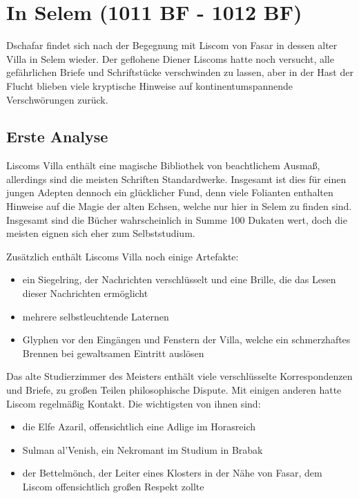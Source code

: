 \hypertarget{in-selem-1011-bf---1012-bf}{%
\section{In Selem (1011 BF - 1012
BF)}\label{in-selem-1011-bf---1012-bf}}

Dschafar findet sich nach der Begegnung mit Liscom von Fasar in dessen
alter Villa in Selem wieder. Der geflohene Diener Liscoms hatte noch
versucht, alle gefährlichen Briefe und Schriftstücke verschwinden zu
lassen, aber in der Hast der Flucht blieben viele kryptische Hinweise
auf kontinentumspannende Verschwörungen zurück.

\hypertarget{erste-analyse}{%
\subsection{Erste Analyse}\label{erste-analyse}}

Liscoms Villa enthält eine magische Bibliothek von beachtlichem Ausmaß,
allerdings sind die meisten Schriften Standardwerke. Insgesamt ist dies
für einen jungen Adepten dennoch ein glücklicher Fund, denn viele
Folianten enthalten Hinweise auf die Magie der alten Echsen, welche nur
hier in Selem zu finden sind. Insgesamt sind die Bücher wahrscheinlich
in Summe 100 Dukaten wert, doch die meisten eignen sich eher zum
Selbststudium.

Zusätzlich enthält Liscoms Villa noch einige Artefakte:

\begin{itemize}
\tightlist
\item
  ein Siegelring, der Nachrichten verschlüsselt und eine Brille, die das
  Lesen dieser Nachrichten ermöglicht
\item
  mehrere selbstleuchtende Laternen
\item
  Glyphen vor den Eingängen und Fenstern der Villa, welche ein
  schmerzhaftes Brennen bei gewaltsamen Eintritt auslösen
\end{itemize}

Das alte Studierzimmer des Meisters enthält viele verschlüsselte
Korrespondenzen und Briefe, zu großen Teilen philosophische Dispute. Mit
einigen anderen hatte Liscom regelmäßig Kontakt. Die wichtigsten von
ihnen sind:

\begin{itemize}
\tightlist
\item
  die Elfe Azaril, offensichtlich eine Adlige im Horasreich
\item
  Sulman al'Venish, ein Nekromant im Studium in Brabak
\item
  der Bettelmönch, der Leiter eines Klosters in der Nähe von Fasar, dem
  Liscom offensichtlich großen Respekt zollte
\end{itemize}

